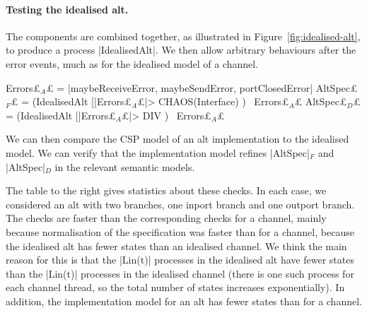 
\paragraph{Testing the idealised alt.}

The components are combined together, as illustrated in
Figure~\ref{fig:idealised-alt}, to produce a process |IdealisedAlt|.  We
then allow arbitrary behaviours after the error events, much as for the
idealised model of a channel.
%
\begin{cspm}
Errors£$_A$£ = {|maybeReceiveError, maybeSendError, portClosedError|}
AltSpec£$_F$£ = (IdealisedAlt [|Errors£$_A$£|> CHAOS(Interface) ) \ Errors£$_A$£
AltSpec£$_D$£ = (IdealisedAlt [|Errors£$_A$£|> DIV ) \ Errors£$_A$£
\end{cspm}

We can then compare the CSP model of an alt implementation to the idealised
model.  We can verify that the implementation model refines |AltSpec|$_F$ and
|AltSpec|$_D$ in the relevant semantic models.

\begin{window}
%
The table to the right gives statistics about these checks.  In each case, we
considered an alt with two branches, one inport branch and one outport
branch.  The checks are faster than the corresponding checks for a channel,
mainly because normalisation of the specification was
faster than for a channel, because the idealised alt has fewer states than an
idealised channel.  We think the main reason for this is that the |Lin(t)|
processes in the idealised alt have fewer states than the |Lin(t)| processes
in the idealised channel (there is one such process for each channel thread,
so the total number of states increases exponentially).  In addition, the
implementation model for an alt has fewer states than for a channel.
\end{window}

